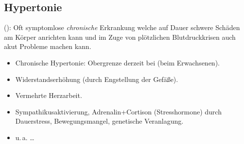 \subsection{Hypertonie}

(): Oft
symptomlose \textit{chronische} Erkrankung welche auf Dauer schwere
Schäden am Körper anrichten kann und im Zuge von plötzlichen
Blutdruckkrisen auch akut Probleme machen kann. 

\begin{itemize}
  \item Chronische Hypertonie: Obergrenze derzeit bei  (beim
  Erwachsenen).
\end{itemize}


{
\begin{itemize}
  \item Widerstandserhöhung (durch Engstellung der Gefäße).
  \item Vermehrte Herzarbeit.
  \item Sympathikusaktivierung, Adrenalin+Cortison (Stresshormone) durch
  Dauerstress,  Bewegungsmangel, genetische Veranlagung.
  \item u.\,a. \ldots
\end{itemize}

}{

}{}{}{}


